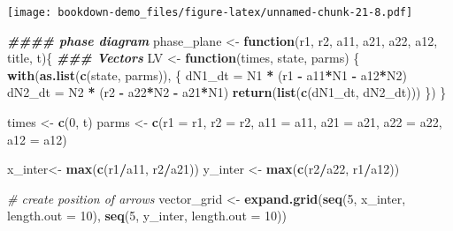 \documentclass[
]{book}
\newenvironment{Shaded}{\begin{snugshade}}{\end{snugshade}}
\newcommand{\AttributeTok}[1]{\textcolor[rgb]{0.13,0.29,0.53}{#1}}
\newcommand{\CommentTok}[1]{\textcolor[rgb]{0.56,0.35,0.01}{\textit{#1}}}
\newcommand{\ControlFlowTok}[1]{\textcolor[rgb]{0.13,0.29,0.53}{\textbf{#1}}}
\newcommand{\DecValTok}[1]{\textcolor[rgb]{0.00,0.00,0.81}{#1}}
\newcommand{\DocumentationTok}[1]{\textcolor[rgb]{0.56,0.35,0.01}{\textbf{\textit{#1}}}}
\newcommand{\FunctionTok}[1]{\textcolor[rgb]{0.13,0.29,0.53}{\textbf{#1}}}
\newcommand{\NormalTok}[1]{#1}
\newcommand{\OtherTok}[1]{\textcolor[rgb]{0.56,0.35,0.01}{#1}}
\newcommand{\SpecialCharTok}[1]{\textcolor[rgb]{0.81,0.36,0.00}{\textbf{#1}}}
\begin{document}
\texttt{[image: bookdown-demo\_files/figure-latex/unnamed-chunk-21-8.pdf]}

\begin{Shaded}
\begin{Highlighting}[]
\DocumentationTok{\#\#\#\# phase diagram}
\NormalTok{phase\_plane }\OtherTok{\textless{}{-}} \ControlFlowTok{function}\NormalTok{(r1, r2, a11, a21, a22, a12, title, t)\{}
    \DocumentationTok{\#\#\# Vectors}
\NormalTok{  LV }\OtherTok{\textless{}{-}} \ControlFlowTok{function}\NormalTok{(times, state, parms) \{}
    \FunctionTok{with}\NormalTok{(}\FunctionTok{as.list}\NormalTok{(}\FunctionTok{c}\NormalTok{(state, parms)), \{}
\NormalTok{      dN1\_dt }\OtherTok{=}\NormalTok{ N1 }\SpecialCharTok{*}\NormalTok{ (r1 }\SpecialCharTok{{-}}\NormalTok{ a11}\SpecialCharTok{*}\NormalTok{N1 }\SpecialCharTok{{-}}\NormalTok{ a12}\SpecialCharTok{*}\NormalTok{N2)}
\NormalTok{      dN2\_dt }\OtherTok{=}\NormalTok{ N2 }\SpecialCharTok{*}\NormalTok{ (r2 }\SpecialCharTok{{-}}\NormalTok{ a22}\SpecialCharTok{*}\NormalTok{N2 }\SpecialCharTok{{-}}\NormalTok{ a21}\SpecialCharTok{*}\NormalTok{N1)}
      \FunctionTok{return}\NormalTok{(}\FunctionTok{list}\NormalTok{(}\FunctionTok{c}\NormalTok{(dN1\_dt, dN2\_dt)))}
\NormalTok{    \})}
\NormalTok{  \}}

\NormalTok{  times }\OtherTok{\textless{}{-}} \FunctionTok{c}\NormalTok{(}\DecValTok{0}\NormalTok{, t)}
\NormalTok{  parms }\OtherTok{\textless{}{-}} \FunctionTok{c}\NormalTok{(}\AttributeTok{r1 =}\NormalTok{ r1, }\AttributeTok{r2 =}\NormalTok{ r2, }\AttributeTok{a11 =}\NormalTok{ a11, }\AttributeTok{a21 =}\NormalTok{ a21, }\AttributeTok{a22 =}\NormalTok{ a22, }\AttributeTok{a12 =}\NormalTok{ a12)}

\NormalTok{  x\_inter}\OtherTok{\textless{}{-}} \FunctionTok{max}\NormalTok{(}\FunctionTok{c}\NormalTok{(r1}\SpecialCharTok{/}\NormalTok{a11, r2}\SpecialCharTok{/}\NormalTok{a21))}
\NormalTok{  y\_inter }\OtherTok{\textless{}{-}} \FunctionTok{max}\NormalTok{(}\FunctionTok{c}\NormalTok{(r2}\SpecialCharTok{/}\NormalTok{a22, r1}\SpecialCharTok{/}\NormalTok{a12))}

  \CommentTok{\# create position of arrows}
\NormalTok{  vector\_grid }\OtherTok{\textless{}{-}} \FunctionTok{expand.grid}\NormalTok{(}\FunctionTok{seq}\NormalTok{(}\DecValTok{5}\NormalTok{, x\_inter, }\AttributeTok{length.out =} \DecValTok{10}\NormalTok{),}
                             \FunctionTok{seq}\NormalTok{(}\DecValTok{5}\NormalTok{, y\_inter, }\AttributeTok{length.out =} \DecValTok{10}\NormalTok{))}


\end{Highlighting}
\end{Shaded}
\end{document}
